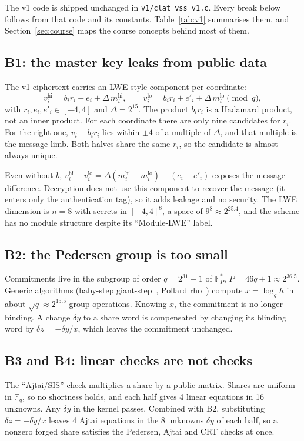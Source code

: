 \documentclass[10pt,a4paper]{article}
\newcommand{\F}{\mathbb{F}}
\newcommand{\Fq}{\mathbb{F}_q}
\newcommand{\code}[1]{\texttt{#1}}
\theoremstyle{definition}
\theoremstyle{remark}
\begin{document}
The v1 code is shipped unchanged in \code{v1/clat\_vss\_v1.c}. Every break below follows from that code and its constants. Table~\ref{tab:v1} summarises them, and Section~\ref{sec:course} maps the course concepts behind most of them.

\subsection{B1: the master key leaks from public data}
The v1 ciphertext carries an LWE-style component per coordinate:
\[
  v^{\mathrm{hi}}_i = b_i r_i + e_i + \Delta\, m^{\mathrm{hi}}_i,\qquad v^{\mathrm{lo}}_i = b_i r_i + e'_i + \Delta\, m^{\mathrm{lo}}_i \pmod q,
\]
with $r_i, e_i, e'_i \in [-4, 4]$ and $\Delta = 2^{15}$. The product $b_i r_i$ is a Hadamard product, not an inner product. For each coordinate there are only nine candidates for $r_i$. For the right one, $v_i - b_i r_i$ lies within $\pm 4$ of a multiple of $\Delta$, and that multiple is the message limb. Both halves share the same $r_i$, so the candidate is almost always unique.

Even without $b$, $v^{\mathrm{hi}}_i - v^{\mathrm{lo}}_i = \Delta(m^{\mathrm{hi}}_i - m^{\mathrm{lo}}_i) + (e_i - e'_i)$ exposes the message difference. Decryption does not use this component to recover the message (it enters only the authentication tag), so it adds leakage and no security. The LWE dimension is $n=8$ with secrets in $[-4,4]^8$, a space of $9^8 \approx 2^{25.4}$, and the scheme has no module structure despite its ``Module-LWE'' label.

\subsection{B2: the Pedersen group is too small}
Commitments live in the subgroup of order $q = 2^{31}-1$ of $\F_P^*$, $P = 46q + 1 \approx 2^{36.5}$. Generic algorithms (baby-step giant-step~\cite{shanks}, Pollard rho~\cite{pollard}) compute $x = \log_g h$ in about $\sqrt{q} \approx 2^{15.5}$ group operations. Knowing $x$, the commitment is no longer binding. A change $\delta y$ to a share word is compensated by changing its blinding word by $\delta z = -\delta y / x$, which leaves the commitment unchanged.

\subsection{B3 and B4: linear checks are not checks}
The ``Ajtai/SIS'' check multiplies a share by a public matrix. Shares are uniform in $\Fq$, so no shortness holds, and each half gives 4 linear equations in 16 unknowns. Any $\delta y$ in the kernel passes. Combined with B2, substituting $\delta z = -\delta y/x$ leaves 4 Ajtai equations in the 8 unknowns $\delta y$ of each half, so a nonzero forged share satisfies the Pedersen, Ajtai and CRT checks at once.
\end{document}
